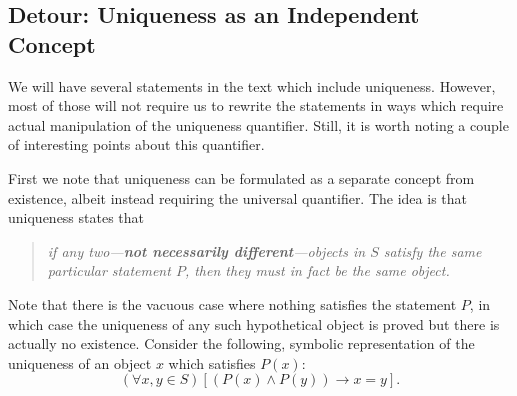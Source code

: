 \subsection{Detour: Uniqueness as an Independent Concept}
We will have several statements in the text which include uniqueness.
However, most of those will not require us to rewrite the statements
in  ways which require  actual manipulation of the uniqueness
quantifier.  Still, it is worth noting a couple of interesting points
about this quantifier.

First we note that uniqueness can be formulated
as a separate concept from existence, albeit instead requiring the
universal quantifier.
The idea is that uniqueness states that
\begin{quote}{\it if any two---{\bf{}not necessarily different}---objects 
in $S$ satisfy the same
particular statement $P$, then they must in fact be the same
object. }\end{quote}
Note that there is the vacuous case where nothing satisfies the 
statement $P$, in which case the uniqueness of any such 
hypothetical object is proved but there
is actually no existence.  Consider the following, symbolic 
representation of the uniqueness of an object $x$ which satisfies
$P(x)$:\footnotemark
\begin{equation}
(\forall x,y\in S)[(P(x)\wedge P(y))\longrightarrow x=y].
\label{UniquenessAloneSymbolically}
\end{equation}






